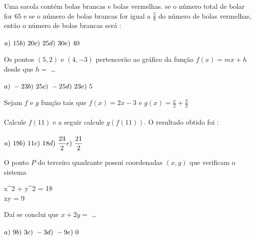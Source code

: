 \hline
\vfill

\begin{quest}
	Uma sacola cont\'em bolas brancas e bolas vermelhas. se o n\'umero total de bolar for $65$ e se o n\'umero de bolas brancas for igual a \(\displaystyle \frac{5}{8}\) do n\'umero de bolas vermelhas, ent\~ao o n\'umero de bolas brancas ser\'a : \\ \\
	\(\displaystyle a)\ 15 \hfill b)\ 20 \hfill c)\ 25 \hfill d)\ 30 \hfill e)\ 40 \)
\end{quest}

\hline
\vfill

\begin{quest}
	Os pontos $(5,2)$ e $(4, -3)$ pertencer\~ao ao gr\'afico da fun\c{c}\~ao $f(x) = mx + h$ desde que $h =$ \dots \\ \\
	\(\displaystyle a)\ -23 \hfill b)\ 25 \hfill c)\ -25 \hfill d)\ 23 \hfill e)\ 5 \)
\end{quest}

\hline
\vfill

\begin{quest}
	Sejam $f$ e $g$  fun\c{c}\~ao tais que \(\displaystyle f(x) = 2x-3\) e \(\displaystyle g(x) = \frac{x}{2} + \frac{3}{2}\) \\ \\
	Calcule $f(11)$ e a seguir calcule $g(f(11))$. O resultado obtido foi : \\ \\
	\(\displaystyle a)\ 19 \hfill b)\ 11 \hfill c)\ 18 \hfill d)\ \frac{23}{2} \hfill e)\ \frac{21}{2} \)
\end{quest}

\newpage

\begin{quest}
	O ponto $P$ do terceiro quadrante possui coordenadas $(x,y)$ que verificam o sistema\\
	\begin{cases}
		x^2 + y^2 = 18 \\
		xy = 9
	\end{cases}
	Da\'i se conclui que $x + 2y =$ \dots \\ \\
	\(\displaystyle a)\ 9 \hfill b)\ 3 \hfill c)\ -3 \hfill d)\ -9 \hfill e)\ 0 \)
\end{quest}

